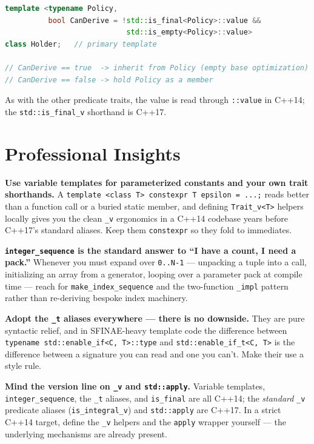 \begin{lstlisting}[language=C++,caption={Choosing storage strategy based on is\_final}]
template <typename Policy,
          bool CanDerive = !std::is_final<Policy>::value &&
                            std::is_empty<Policy>::value>
class Holder;   // primary template

// CanDerive == true  -> inherit from Policy (empty base optimization)
// CanDerive == false -> hold Policy as a member
\end{lstlisting}

As with the other predicate traits, the value is read through \texttt{::value} in C++14; the \texttt{std::is\_final\_v} shorthand is C++17.

\section{Professional Insights}
\label{sec:c14-templates-insights}

\textbf{Use variable templates for parameterized constants and your own trait shorthands.} A \texttt{template <class T> constexpr T epsilon = ...;} reads better than a function call or a buried static member, and defining \texttt{Trait\_v<T>} helpers locally gives you the clean \texttt{\_v} ergonomics in a C++14 codebase years before C++17's standard aliases. Keep them \texttt{constexpr} so they fold to immediates.

\textbf{\texttt{integer\_sequence} is the standard answer to ``I have a count, I need a pack.''} Whenever you must expand over \texttt{0..N-1} --- unpacking a tuple into a call, initializing an array from a generator, looping over a parameter pack at compile time --- reach for \texttt{make\_index\_sequence} and the two-function \texttt{\_impl} pattern rather than re-deriving bespoke index machinery.

\textbf{Adopt the \texttt{\_t} aliases everywhere --- there is no downside.} They are pure syntactic relief, and in SFINAE-heavy template code the difference between \texttt{typename std::enable\_if<C, T>::type} and \texttt{std::enable\_if\_t<C, T>} is the difference between a signature you can read and one you can't. Make their use a style rule.

\textbf{Mind the version line on \texttt{\_v} and \texttt{std::apply}.} Variable templates, \texttt{integer\_sequence}, the \texttt{\_t} aliases, and \texttt{is\_final} are all C++14; the \emph{standard} \texttt{\_v} predicate aliases (\texttt{is\_integral\_v}) and \texttt{std::apply} are C++17. In a strict C++14 target, define the \texttt{\_v} helpers and the \texttt{apply} wrapper yourself --- the underlying mechanisms are already present.
